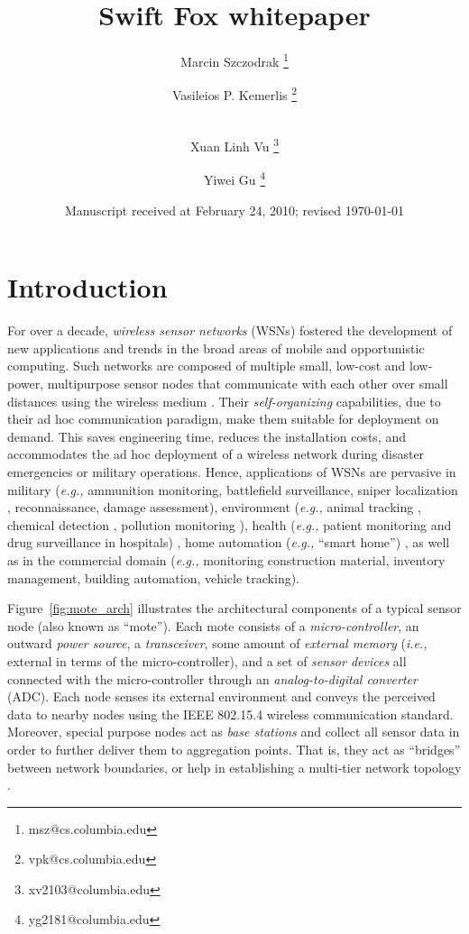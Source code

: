 \documentclass[11pt]{article}
\begin{document}
\title{Swift Fox whitepaper}
\author{Marcin Szczodrak \footnote{msz@cs.columbia.edu}}
\author{Vasileios P. Kemerlis \footnote{vpk@cs.columbia.edu}}
\author{\\ Xuan Linh Vu \footnote{xv2103@columbia.edu}}
\author{Yiwei Gu \footnote{yg2181@columbia.edu}}
\date{Manuscript received at February 24, 2010; revised \today}
\maketitle


\section{Introduction}
\label{sec:introduction}

For over a decade, \textit{wireless sensor networks} (WSNs) fostered the
development of new applications and trends in the broad areas of mobile
and opportunistic computing. Such networks are composed of multiple small,
low-cost and low-power, multipurpose sensor nodes that communicate with
each other over small distances using the wireless medium
\cite{culler:2004}. Their \textit{self-organizing} capabilities, due to
their ad hoc communication paradigm, make them suitable for deployment on
demand. This saves engineering time, reduces the installation costs, and
accommodates the ad hoc deployment of a wireless network during disaster
emergencies or military operations. Hence, applications of WSNs are
pervasive in military (\textit{e.g.,} ammunition monitoring, battlefield
surveillance, sniper localization \cite{simon:2004}, reconnaissance,
damage assessment), environment (\textit{e.g.,} animal tracking
\cite{szewczyk:2004}, chemical detection \cite{allred:2007}, pollution
monitoring \cite{hartung:2006}), health (\textit{e.g.,} patient
monitoring and drug surveillance in hospitals) \cite{lorincz:2008}, home
automation (\textit{e.g.,} ``smart home'') \cite{kim:2008}, as well as in
the commercial domain (\textit{e.g.,} monitoring construction material,
inventory management, building automation, vehicle tracking).

Figure~\ref{fig:mote_arch} illustrates the architectural components of a
typical sensor node (also known as ``mote''). Each mote consists of a
\textit{micro-controller}, an outward \textit{power source}, a
\textit{transceiver}, some amount of \textit{external memory}
(\textit{i.e.,} external in terms of the micro-controller), and a set of
\textit{sensor devices} all connected with the micro-controller through an
\textit{analog-to-digital converter} (ADC). Each node senses its external
environment and conveys the perceived data to nearby nodes using the IEEE
802.15.4 wireless communication standard. Moreover, special purpose nodes
act as \textit{base stations} and collect all sensor data in order to
further deliver them to aggregation points. That is, they act as
``bridges'' between network boundaries, or help in establishing a
multi-tier network topology \cite{gnawali:2006}.
\end{document}
